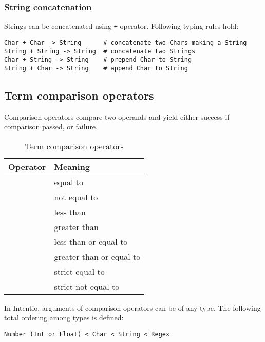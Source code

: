 \subsubsection{String concatenation}

Strings can be concatenated using \lstinline{+} operator. Following typing rules hold:

\begin{lstlisting}
Char + Char -> String      # concatenate two Chars making a String
String + String -> String  # concatenate two Strings
Char + String -> String    # prepend Char to String
String + Char -> String    # append Char to String
\end{lstlisting}

\subsection{Term comparison operators}

Comparison operators compare two operands and yield either success if comparison passed, or failure.

\begin{bnfutils}
\begin{table}[ht]
  \caption{Term comparison operators}
  \begin{center}
  \begin{tabular}[t]{c|l}
    \bfseries{Operator} & \bfseries{Meaning} \\
    \hline
    \term{==} & equal to \\
    \term{!=} & not equal to \\
    \term{<} & less than \\
    \term{>} & greater than \\
    \term{<=} & less than or equal to \\
    \term{>=} & greater than or equal to \\
    \term{===} & strict equal to \\
    \term{!==} & strict not equal to
  \end{tabular}
  \end{center}
\end{table}
\end{bnfutils}

In Intentio, arguments of comparison operators can be of any type. The following total ordering among types is defined:

\begin{lstlisting}
Number (Int or Float) < Char < String < Regex
\end{lstlisting}

